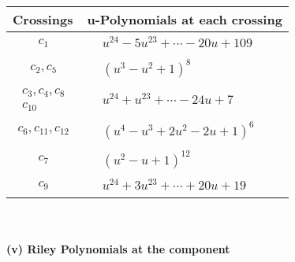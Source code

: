 \documentclass[1p]{elsarticle_modified}
\theoremstyle{definition}
\begin{document}
\begin{tabular}{m{50pt}|m{274pt}}
Crossings & \hspace{64pt}u-Polynomials at each crossing \\
\hline $$\begin{aligned}c_{1}\end{aligned}$$&$\begin{aligned}
&u^{24}-5 u^{23}+\cdots-20 u+109
\end{aligned}$\\
\hline $$\begin{aligned}c_{2},c_{5}\end{aligned}$$&$\begin{aligned}
&(u^3- u^2+1)^8
\end{aligned}$\\
\hline $$\begin{aligned}c_{3},c_{4},c_{8}\\c_{10}\end{aligned}$$&$\begin{aligned}
&u^{24}+u^{23}+\cdots-24 u+7
\end{aligned}$\\
\hline $$\begin{aligned}c_{6},c_{11},c_{12}\end{aligned}$$&$\begin{aligned}
&(u^4- u^3+2 u^2-2 u+1)^6
\end{aligned}$\\
\hline $$\begin{aligned}c_{7}\end{aligned}$$&$\begin{aligned}
&(u^2- u+1)^{12}
\end{aligned}$\\
\hline $$\begin{aligned}c_{9}\end{aligned}$$&$\begin{aligned}
&u^{24}+3 u^{23}+\cdots+20 u+19
\end{aligned}$\\
\hline
\end{tabular}\\~\\
\newpage\renewcommand{\arraystretch}{1}
\flushleft \textbf{(v) Riley Polynomials at the component}\newline \\
\end{document}
